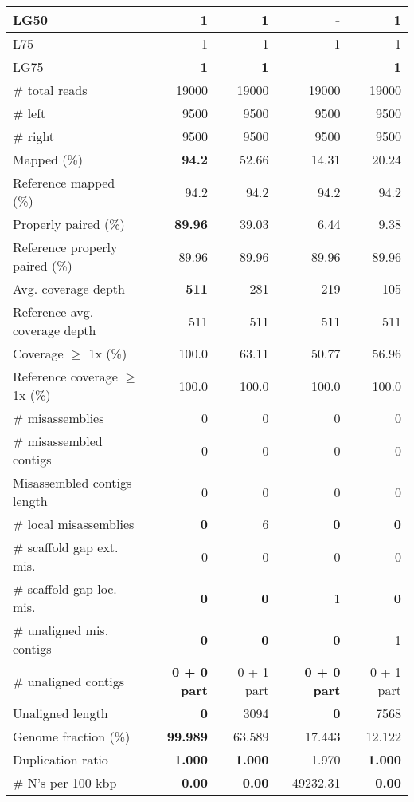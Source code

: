 \documentclass[12pt,a4paper]{article}
\begin{document}
\begin{table}[ht]
\begin{center}
\begin{tabular}{|l*{4}{|r}|}
LG50 & {\bf 1} & {\bf 1} & - & {\bf 1} \\ \hline
L75 & 1 & 1 & 1 & 1 \\ \hline
LG75 & {\bf 1} & {\bf 1} & - & {\bf 1} \\ \hline
\# total reads & 19000 & 19000 & 19000 & 19000 \\ \hline
\# left & 9500 & 9500 & 9500 & 9500 \\ \hline
\# right & 9500 & 9500 & 9500 & 9500 \\ \hline
Mapped (\%) & {\bf 94.2} & 52.66 & 14.31 & 20.24 \\ \hline
Reference mapped (\%) & 94.2 & 94.2 & 94.2 & 94.2 \\ \hline
Properly paired (\%) & {\bf 89.96} & 39.03 & 6.44 & 9.38 \\ \hline
Reference properly paired (\%) & 89.96 & 89.96 & 89.96 & 89.96 \\ \hline
Avg. coverage depth & {\bf 511} & 281 & 219 & 105 \\ \hline
Reference avg. coverage depth & 511 & 511 & 511 & 511 \\ \hline
Coverage $\geq$ 1x (\%) & 100.0 & 63.11 & 50.77 & 56.96 \\ \hline
Reference coverage $\geq$ 1x (\%) & 100.0 & 100.0 & 100.0 & 100.0 \\ \hline
\# misassemblies & 0 & 0 & 0 & 0 \\ \hline
\# misassembled contigs & 0 & 0 & 0 & 0 \\ \hline
Misassembled contigs length & 0 & 0 & 0 & 0 \\ \hline
\# local misassemblies & {\bf 0} & 6 & {\bf 0} & {\bf 0} \\ \hline
\# scaffold gap ext. mis. & 0 & 0 & 0 & 0 \\ \hline
\# scaffold gap loc. mis. & {\bf 0} & {\bf 0} & 1 & {\bf 0} \\ \hline
\# unaligned mis. contigs & {\bf 0} & {\bf 0} & {\bf 0} & 1 \\ \hline
\# unaligned contigs & {\bf 0 + 0 part} & 0 + 1 part & {\bf 0 + 0 part} & 0 + 1 part \\ \hline
Unaligned length & {\bf 0} & 3094 & {\bf 0} & 7568 \\ \hline
Genome fraction (\%) & {\bf 99.989} & 63.589 & 17.443 & 12.122 \\ \hline
Duplication ratio & {\bf 1.000} & {\bf 1.000} & 1.970 & {\bf 1.000} \\ \hline
\# N's per 100 kbp & {\bf 0.00} & {\bf 0.00} & 49232.31 & {\bf 0.00} \\ \hline

\end{tabular}
\end{center}
\end{table}
\end{document}
